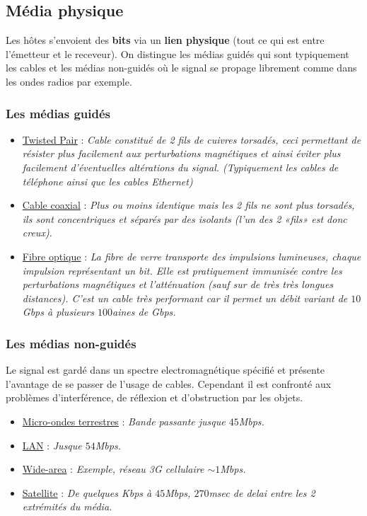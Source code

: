 \documentclass{article}
\newcommand{\ora}[1]{\textcolor{darko}{#1}}
\newcommand{\point}[2]{\item \ora{\underline{#1}} : \textit{#2}}
\begin{document}
\subsection{Média physique}

Les hôtes s'envoient des \textbf{bits} via un \textbf{lien physique} (tout ce qui est entre l'émetteur et le 
receveur). On distingue les médias guidés qui sont typiquement les cables et les médias non-guidés où le signal
se propage librement comme dans les ondes radios par exemple.

\subsubsection{Les médias guidés}

\noindent \begin{itemize}
\point{Twisted Pair}{Cable constitué de 2 fils de cuivres torsadés, ceci permettant de
résister plus facilement aux perturbations magnétiques et ainsi éviter plus facilement d'éventuelles altérations 
du signal. (Typiquement les cables de téléphone ainsi que les cables Ethernet)}
\point{Cable coaxial}{Plus ou moins identique mais les 2 fils ne sont plus torsadés, 
ils sont concentriques et séparés par des isolants (l'un des 2 «fils» est donc creux).}
\point{Fibre optique}{La fibre de verre transporte des impulsions lumineuses, chaque
impulsion représentant un bit. Elle est pratiquement immunisée contre les perturbations magnétiques et 
l'atténuation (sauf sur de très très longues distances). C'est un cable très performant car il permet un débit 
variant de $10$Gbps à plusieurs $100$aines de Gbps.}
\end{itemize}

\subsubsection{Les médias non-guidés}

Le signal est gardé dans un spectre electromagnétique spécifié et présente l'avantage de se passer de l'usage de
cables. Cependant il est confronté aux problèmes d'interférence, de réflexion et d'obstruction par les objets.
\begin{itemize}
\point{Micro-ondes terrestres}{Bande passante jusque $45$Mbps.}
\point{LAN}{Jusque $54$Mbps.}
\point{Wide-area}{Exemple, réseau 3G cellulaire $\sim1$Mbps.}
\point{Satellite}{De quelques Kbps à $45$Mbps, $270$msec de delai entre les 2 extrémités du média.}
\end{itemize}
\end{document}
